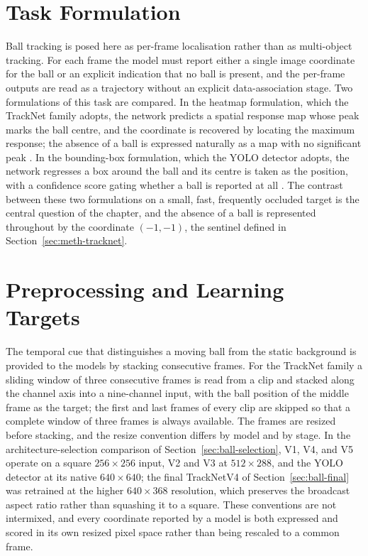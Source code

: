 \section{Task Formulation}
\label{sec:ball-task}

Ball tracking is posed here as per-frame localisation rather than as
multi-object tracking. For each frame the model must report either a single
image coordinate for the ball or an explicit indication that no ball is
present, and the per-frame outputs are read as a trajectory without an explicit
data-association stage. Two formulations of this task are compared. In the
heatmap formulation, which the TrackNet family adopts, the network predicts a
spatial response map whose peak marks the ball centre, and the coordinate is
recovered by locating the maximum response; the absence of a ball is expressed
naturally as a map with no significant peak \cite{huang2019tracknet,
zhou2019centernet}. In the bounding-box formulation, which the YOLO detector
adopts, the network regresses a box around the ball and its centre is taken as
the position, with a confidence score gating whether a ball is reported at all
\cite{redmon2016yolo}. The contrast between these two formulations on a small,
fast, frequently occluded target is the central question of the chapter, and
the absence of a ball is represented throughout by the coordinate $(-1, -1)$,
the sentinel defined in Section~\ref{sec:meth-tracknet}.

\section{Preprocessing and Learning Targets}
\label{sec:ball-preproc}

The temporal cue that distinguishes a moving ball from the static background is
provided to the models by stacking consecutive frames. For the TrackNet family
a sliding window of three consecutive frames is read from a clip and stacked
along the channel axis into a nine-channel input, with the ball position of the
middle frame as the target; the first and last frames of every clip are skipped
so that a complete window of three frames is always available. The frames are
resized before stacking, and the resize convention differs by model and by
stage. In the architecture-selection comparison of
Section~\ref{sec:ball-selection}, V1, V4, and V5 operate on a square
$256 \times 256$ input, V2 and V3 at $512 \times 288$, and the YOLO detector at
its native $640 \times 640$; the final TrackNetV4 of
Section~\ref{sec:ball-final} was retrained at the higher $640 \times 368$
resolution, which preserves the broadcast aspect ratio rather than squashing it
to a square. These conventions are not
intermixed, and every coordinate reported by a model is both expressed and
scored in its own resized pixel space rather than being rescaled to a common
frame.

